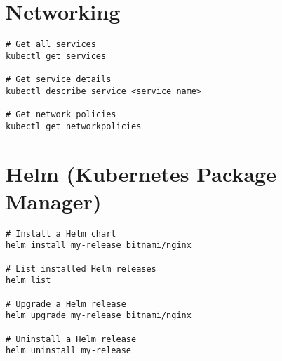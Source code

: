 \documentclass[11pt]{article}
\begin{document}
    \section*{Networking}
    \begin{lstlisting}[style=kubeStyle]
# Get all services
kubectl get services

# Get service details
kubectl describe service <service_name>

# Get network policies
kubectl get networkpolicies
    \end{lstlisting}

    \section*{Helm (Kubernetes Package Manager)}
    \begin{lstlisting}[style=kubeStyle]
# Install a Helm chart
helm install my-release bitnami/nginx

# List installed Helm releases
helm list

# Upgrade a Helm release
helm upgrade my-release bitnami/nginx

# Uninstall a Helm release
helm uninstall my-release
    \end{lstlisting}
\end{document}
